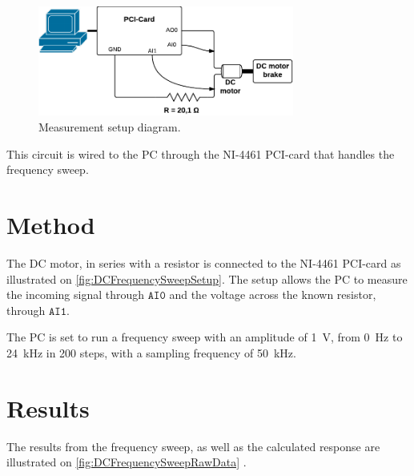 \begin{figure}
\centering
		\includegraphics [width=0.75\textwidth]{figures/test/DCR_circuit}
		\caption{Measurement setup diagram.}
		\label{fig:DCFrequencySweepSetup}
	\end{figure}
This circuit is wired to the PC through the NI-4461 PCI-card that handles the frequency sweep.

\section*{Method}
The DC motor, in series with a resistor is connected to the NI-4461 PCI-card as illustrated on \autoref{fig:DCFrequencySweepSetup}. The setup allows the PC to measure the incoming signal through $\texttt{AI0}$ and the voltage across the known resistor, through $\texttt{AI1}$.  

The PC is set to run a frequency sweep with an amplitude of \SI{1}{\volt}, from \SI{0}{\hertz} to \SI{24}{\kilo\hertz} in 200 steps, with a sampling frequency of \SI{50}{\kilo\hertz}.

\section*{Results}
The results from the frequency sweep, as well as the calculated response are illustrated on \ref{fig:DCFrequencySweepRawData} .

